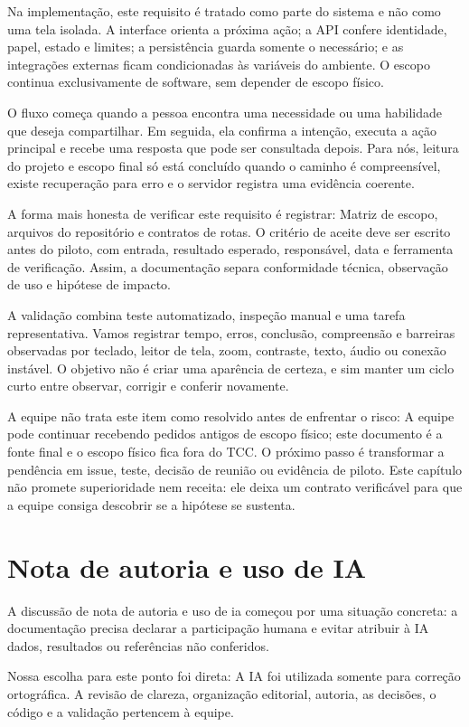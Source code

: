 \documentclass[12pt,oneside,a4paper,article]{abntex2}
\begin{document}
Na implementação, este requisito é tratado como parte do sistema e não como uma tela isolada. A interface orienta a próxima ação; a API confere identidade, papel, estado e limites; a persistência guarda somente o necessário; e as integrações externas ficam condicionadas às variáveis do ambiente. O escopo continua exclusivamente de software, sem depender de escopo físico.

O fluxo começa quando a pessoa encontra uma necessidade ou uma habilidade que deseja compartilhar. Em seguida, ela confirma a intenção, executa a ação principal e recebe uma resposta que pode ser consultada depois. Para nós, leitura do projeto e escopo final só está concluído quando o caminho é compreensível, existe recuperação para erro e o servidor registra uma evidência coerente.

A forma mais honesta de verificar este requisito é registrar: Matriz de escopo, arquivos do repositório e contratos de rotas. O critério de aceite deve ser escrito antes do piloto, com entrada, resultado esperado, responsável, data e ferramenta de verificação. Assim, a documentação separa conformidade técnica, observação de uso e hipótese de impacto.

A validação combina teste automatizado, inspeção manual e uma tarefa representativa. Vamos registrar tempo, erros, conclusão, compreensão e barreiras observadas por teclado, leitor de tela, zoom, contraste, texto, áudio ou conexão instável. O objetivo não é criar uma aparência de certeza, e sim manter um ciclo curto entre observar, corrigir e conferir novamente.

A equipe não trata este item como resolvido antes de enfrentar o risco: A equipe pode continuar recebendo pedidos antigos de escopo físico; este documento é a fonte final e o escopo físico fica fora do TCC. O próximo passo é transformar a pendência em issue, teste, decisão de reunião ou evidência de piloto. Este capítulo não promete superioridade nem receita: ele deixa um contrato verificável para que a equipe consiga descobrir se a hipótese se sustenta.

\section{Nota de autoria e uso de IA}
A discussão de nota de autoria e uso de ia começou por uma situação concreta: a documentação precisa declarar a participação humana e evitar atribuir à IA dados, resultados ou referências não conferidos.

Nossa escolha para este ponto foi direta: A IA foi utilizada somente para correção ortográfica. A revisão de clareza, organização editorial, autoria, as decisões, o código e a validação pertencem à equipe.
\end{document}
